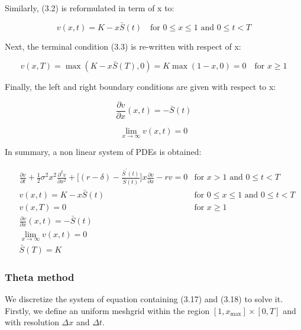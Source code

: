 Similarly, (3.2) is reformulated in term of x to:

\begin{equation}
    v(x, t) = K - x\bar{S}(t) \quad  \text{for $0 \le x \le 1$ and $0 \le t < T$}
\end{equation}

Next, the terminal condition (3.3) is re-written with respect of x:

\begin{equation}
    v(x, T) = \max(K - x\bar{S}(T), 0) = K \max(1 - x, 0) = 0 \quad \text{for $x \ge 1$}
\end{equation}

Finally, the left and right boundary conditions are given with respect to x:

\begin{equation}
    \frac{\partial{v}}{\partial{x}}(x, t) = -\bar{S}(t)
\end{equation}

\begin{equation}
    \lim_{x \rightarrow \infty} v(x, t) = 0
\end{equation}

In summary, a non linear system of PDEs is obtained:

\begin{align}
    & \frac{\partial{v}}{\partial{t}} + \frac{1}{2}\sigma^{2} x^2 \frac{\partial^2{v}}{\partial{x}^2} + \bigg[(r - \delta) - \frac{\bar{S}^\prime(t)}{\bar{S}(t)}\bigg]x\frac{\partial{v}}{\partial{x}} - rv = 0 & \text{for $x > 1$ and $0 \le t < T$} \\
    & v(x, t) = K - x\bar{S}(t) & \text{for $0 \le x \le 1$ and $0 \le t < T$} \\
    & v(x, T) = 0 & \text{for $x \ge 1$} \\
    & \frac{\partial{v}}{\partial{x}}(x, t) = -\bar{S}(t) & \\
    & \lim_{x \rightarrow \infty} v(x, t) = 0 & \\
    & \bar{S}(T) = K & 
\end{align}

\subsubsection{Theta method}

We discretize the system of equation containing (3.17) and (3.18) to solve it. 
Firstly, we define an uniform meshgrid within the region $[1, x_\text{max}]\times [0, T]$ and 
with resolution $\Delta x$ and $\Delta t$.

